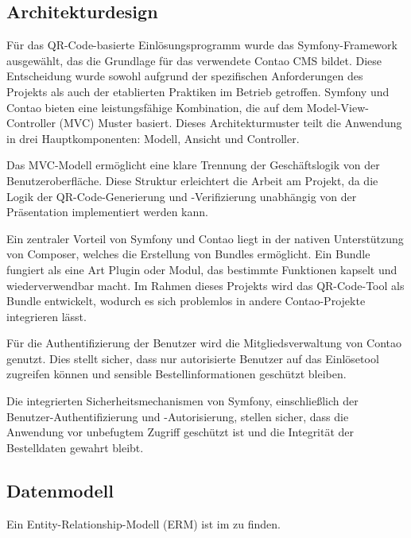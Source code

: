 \subsection{Architekturdesign}
\label{sec:Architekturdesign}

Für das QR-Code-basierte Einlösungsprogramm wurde das Symfony-Framework ausgewählt, das die Grundlage für das verwendete Contao CMS bildet. Diese Entscheidung wurde sowohl aufgrund der spezifischen Anforderungen des Projekts als auch der etablierten Praktiken im Betrieb getroffen. Symfony und Contao bieten eine leistungsfähige Kombination, die auf dem Model-View-Controller (\acs{MVC}) Muster basiert. Dieses Architekturmuster teilt die Anwendung in drei Hauptkomponenten: Modell, Ansicht und Controller.

Das MVC-Modell ermöglicht eine klare Trennung der Geschäftslogik von der Benutzeroberfläche. Diese Struktur erleichtert die Arbeit am Projekt, da die Logik der QR-Code-Generierung und -Verifizierung unabhängig von der Präsentation implementiert werden kann.

Ein zentraler Vorteil von Symfony und Contao liegt in der nativen Unterstützung von Composer, welches die Erstellung von Bundles ermöglicht. Ein Bundle fungiert als eine Art Plugin oder Modul, das bestimmte Funktionen kapselt und wiederverwendbar macht. Im Rahmen dieses Projekts wird das QR-Code-Tool als Bundle entwickelt, wodurch es sich problemlos in andere Contao-Projekte integrieren lässt.

Für die Authentifizierung der Benutzer wird die Mitgliedsverwaltung von Contao genutzt. Dies stellt sicher, dass nur autorisierte Benutzer auf das Einlösetool zugreifen können und sensible Bestellinformationen geschützt bleiben.

Die integrierten Sicherheitsmechanismen von Symfony, einschließlich der Benutzer-Authentifizierung und -Autorisierung, stellen sicher, dass die Anwendung vor unbefugtem Zugriff geschützt ist und die Integrität der Bestelldaten gewahrt bleibt.


\subsection{Datenmodell}
\label{sec:Datenmodell}

Ein Entity-Relationship-Modell (ERM) ist im  zu finden.


